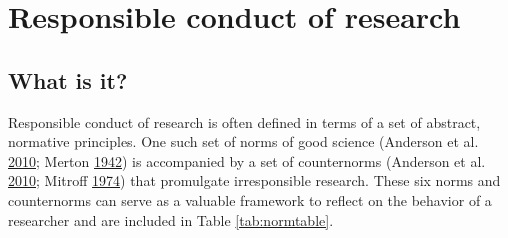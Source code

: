 \documentclass[a5paper]{book}
\begin{document}
\hypertarget{responsible-conduct-of-research}{\section{Responsible
conduct of research}\label{responsible-conduct-of-research}}

\subsection{What is it?}\label{what-is-it}

Responsible conduct of research is often defined in terms of a set of
abstract, normative principles. One such set of norms of good science
(Anderson et al.
\protect\hyperlink{ref-doi:10.1353ux2fjhe.0.0095}{2010}; Merton
\protect\hyperlink{ref-merton1942}{1942}) is accompanied by a set of
counternorms (Anderson et al.
\protect\hyperlink{ref-doi:10.1353ux2fjhe.0.0095}{2010}; Mitroff
\protect\hyperlink{ref-doi:10.2307ux2f2094423}{1974}) that promulgate
irresponsible research. These six norms and counternorms can serve as a
valuable framework to reflect on the behavior of a researcher and are
included in Table \ref{tab:normtable}.

\begin{table}[!h]

\caption{\label{tab:normtable}Six norms of responsible conduct of research and their respective
  counternorms.}
\centering
{}
\end{table}
\end{document}
